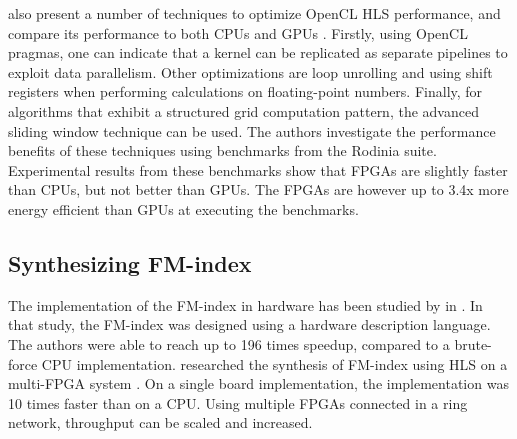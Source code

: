 \citeauthor{paulino_optimizing_2020} also present a number of techniques to optimize OpenCL HLS performance, and compare its performance to both CPUs and GPUs \cite{paulino_optimizing_2020}.
Firstly, using OpenCL pragmas, one can indicate that a kernel can be replicated as separate pipelines to exploit data parallelism.
Other optimizations are loop unrolling and using shift registers when performing calculations on floating-point numbers.
Finally, for algorithms that exhibit a structured grid computation pattern, the advanced sliding window technique can be used.
The authors investigate the performance benefits of these techniques using benchmarks from the Rodinia suite.
Experimental results from these benchmarks show that FPGAs are slightly faster than CPUs, but not better than GPUs.
The FPGAs are however up to 3.4x more energy efficient than GPUs at executing the benchmarks.

\subsection{Synthesizing FM-index}

The implementation of the FM-index in hardware has been studied by \citeauthor{fernandez_string_2011} in \citeyear{fernandez_string_2011} \cite{fernandez_string_2011}.
In that study, the FM-index was designed using a hardware description language.
The authors were able to reach up to 196 times speedup, compared to a brute-force CPU implementation.
\citeauthor{ullah_implementation_2020} researched the synthesis of FM-index using HLS on a multi-FPGA system \cite{ullah_implementation_2020}.
On a single board implementation, the implementation was 10 times faster than on a CPU.
Using multiple FPGAs connected in a ring network, throughput can be scaled and increased.
